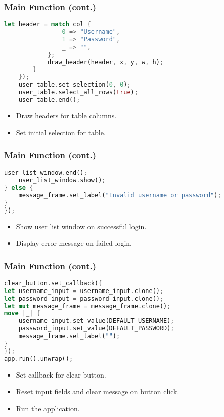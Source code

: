 \documentclass[aspectratio=169, table]{beamer}
\begin{document}
	
	\begin{frame}[fragile]
		\frametitle{Main Function (cont.)}
		\begin{lstlisting}[language=Rust]
			let header = match col {
				0 => "Username",
				1 => "Password",
				_ => "",
			};
			draw_header(header, x, y, w, h);
		}
	});
	user_table.set_selection(0, 0);
	user_table.select_all_rows(true);
	user_table.end();
\end{lstlisting}
\begin{itemize}
	\item Draw headers for table columns.
	\item Set initial selection for table.
\end{itemize}
\end{frame}

\begin{frame}[fragile]
\frametitle{Main Function (cont.)}
\begin{lstlisting}[language=Rust]
	user_list_window.end();
	user_list_window.show();
} else {
	message_frame.set_label("Invalid username or password");
}
});
\end{lstlisting}
\begin{itemize}
\item Show user list window on successful login.
\item Display error message on failed login.
\end{itemize}
\end{frame}

\begin{frame}[fragile]
\frametitle{Main Function (cont.)}
\vspace{15pt}
\begin{lstlisting}[language=Rust]
clear_button.set_callback({
let username_input = username_input.clone();
let password_input = password_input.clone();
let mut message_frame = message_frame.clone();
move |_| {
	username_input.set_value(DEFAULT_USERNAME);
	password_input.set_value(DEFAULT_PASSWORD);
	message_frame.set_label("");
}
});
app.run().unwrap();
\end{lstlisting}
\begin{itemize}
\item Set callback for clear button.
\item Reset input fields and clear message on button click.
\item Run the application.
\end{itemize}
\end{frame}
\end{document}
